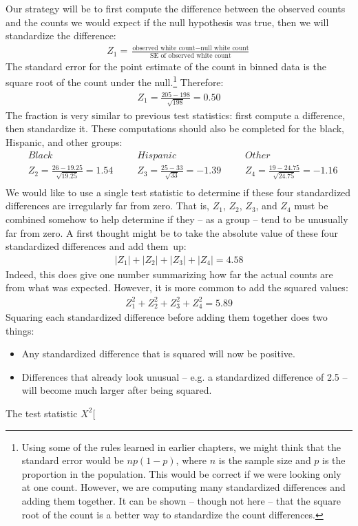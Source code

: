 Our strategy will be to first compute the difference between the observed counts and the counts we would expect if the null hypothesis was true, then we will standardize the difference:
\begin{align*}
Z_{1} = \frac{\text{observed white count} - \text{null white count}}
				{\text{SE of observed white count}}
\end{align*}
The standard error for the point estimate of the count in binned data is the square root of the count under the null.\footnote{Using some of the rules learned in earlier chapters, we might think that the standard error would be $np(1-p)$, where $n$ is the sample size and $p$ is the proportion in the population. This would be correct if we were looking only at one count. However, we are computing many standardized differences and adding them together. It can be shown -- though not here -- that the square root of the count is a better way to standardize the count differences.} Therefore:
\begin{align*}
Z_1 = \frac{205 - 198}{\sqrt{198}} = 0.50
\end{align*}
The fraction is very similar to previous test statistics: first compute a difference, then standardize it. These computations should also be completed for the black, Hispanic, and other groups:
\begin{align*}
&Black && Hispanic	&&Other \\
& Z_2 = \frac{26-19.25}{\sqrt{19.25}}=1.54\ \ \ \ 
	&& Z_3 = \frac{25-33}{\sqrt{33}}=-1.39\ \ \ \ 
	&& Z_4 = \frac{19-24.75}{\sqrt{24.75}}=-1.16 \\
\end{align*}
We would like to use a single test statistic to determine if these four standardized differences are irregularly far from zero. That is, $Z_1$, $Z_2$, $Z_3$, and $Z_4$ must be combined somehow to help determine if they -- as a group -- tend to be unusually far from zero. A first thought might be to take the absolute value of these four standardized differences and add them~up:
\begin{align*}
|Z_1| + |Z_2| + |Z_3| + |Z_4| = 4.58
\end{align*}
Indeed, this does give one number summarizing how far the actual counts are from what was expected. However, it is more common to add the squared values:
\begin{align*}
Z_1^2 + Z_2^2 + Z_3^2 + Z_4^2 = 5.89
\end{align*}
Squaring each standardized difference before adding them together does two things:
\begin{itemize}
\setlength{\itemsep}{0mm}
\item Any standardized difference that is squared will now be positive.
\item Differences that already look unusual -- e.g. a standardized difference of 2.5 -- will become much larger after being squared.
\end{itemize}
The test statistic $X^2$\marginpar[\raggedright\vspace{9mm}

